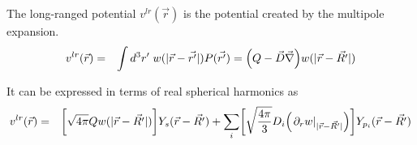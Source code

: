 \documentclass[11pt,a4paper]{report}
\begin{document}
The long-ranged potential $v^{lr}(\vec{r})$ is the potential created
by the multipole expansion.
\begin{eqnarray}
v^{lr}(\vec{r})&=&
\int d^3r'\; w(|\vec{r}-\vec{r'}|)P(\vec{r'})
=
\Bigl(Q-\vec{D}\vec{\nabla}\Bigr)w(|\vec{r}-\vec{R'}|)
\end{eqnarray}

It can be expressed in terms of real spherical harmonics as
\begin{eqnarray}
v^{lr}(\vec{r})&=&
\biggl[
\sqrt{4\pi}Q w(|\vec{r}-\vec{R'}|)
\biggr] 
Y_s(\vec{r}-\vec{R'})
+\sum_i
\biggl[
\sqrt{\frac{4\pi}{3}} D_i
\Bigl(\left.\partial_r w\right|_{|\vec{r}-\vec{R'}|}\Bigr) 
\biggr]
Y_{p_i}(\vec{r}-\vec{R'})
\end{eqnarray}




\end{document}
